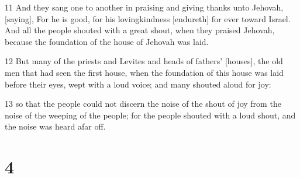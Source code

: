 \par 11 And they sang one to another in praising and giving thanks unto Jehovah, [saying], For he is good, for his lovingkindness [endureth] for ever toward Israel. And all the people shouted with a great shout, when they praised Jehovah, because the foundation of the house of Jehovah was laid.
\par 12 But many of the priests and Levites and heads of fathers' [houses], the old men that had seen the first house, when the foundation of this house was laid before their eyes, wept with a loud voice; and many shouted aloud for joy:
\par 13 so that the people could not discern the noise of the shout of joy from the noise of the weeping of the people; for the people shouted with a loud shout, and the noise was heard afar off.

\chapter{4}

